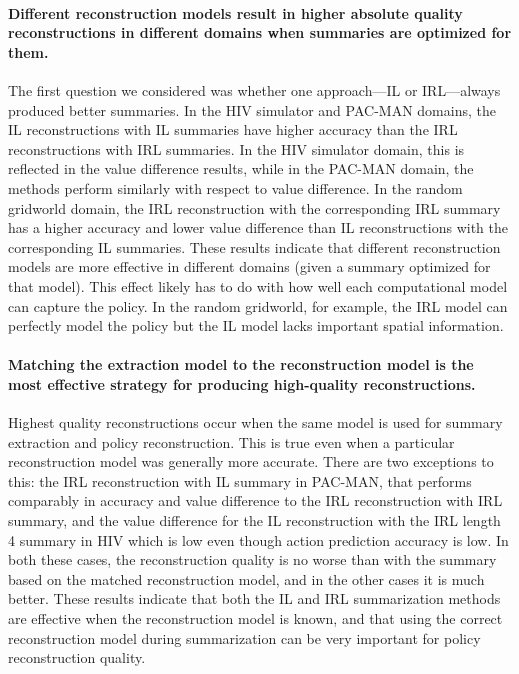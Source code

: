 \documentclass{article}
\begin{document}
\paragraph{Different reconstruction models result in higher absolute quality reconstructions in different domains when summaries are optimized for them.} The first question we considered was whether one approach---IL or IRL---always produced better summaries. In the HIV simulator and PAC-MAN domains, the IL reconstructions with IL summaries have higher accuracy than the IRL reconstructions with IRL summaries. In the HIV simulator domain, this is reflected in the value difference results, while in the PAC-MAN domain, the methods perform similarly with respect to value difference. In the random gridworld domain, the IRL reconstruction with the corresponding IRL summary has a higher accuracy and lower value difference than IL reconstructions with the corresponding IL summaries. These results indicate that different reconstruction models are more effective in different domains (given a summary optimized for that model). This effect likely has to do with how well each computational model can capture the policy. In the random gridworld, for example, the IRL model can perfectly model the policy but the IL model lacks important spatial information. 

\paragraph{Matching the extraction model to the reconstruction model is the most effective strategy for producing high-quality reconstructions.} Highest quality reconstructions occur when the same model is used for summary extraction and policy reconstruction. This is true even when a particular reconstruction model was generally more accurate. There are two exceptions to this: the IRL reconstruction with IL summary in PAC-MAN, that performs comparably in accuracy and value difference to the IRL reconstruction with IRL summary, and the value difference for the IL reconstruction with the IRL length 4 summary in HIV which is low even though action prediction accuracy is low. In both these cases, the reconstruction quality is no worse than with the summary based on the matched reconstruction model, and in the other cases it is much better. These results indicate that both the IL and IRL summarization methods are effective when the reconstruction model is known, and that using the correct reconstruction model during summarization can be very important for policy reconstruction quality.
\end{document}
